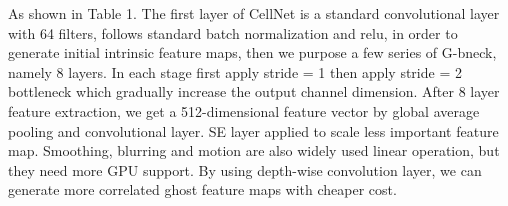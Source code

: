 As shown in Table 1. The first layer of CellNet is a standard convolutional layer with 64 filters, follows standard batch normalization and relu, in order to generate initial intrinsic feature maps, then we purpose a few series of G-bneck, namely 8 layers. In each stage first apply stride = 1 then apply stride = 2 bottleneck which gradually increase the output channel dimension. After 8 layer feature extraction, we get a 512-dimensional feature vector by global average pooling and convolutional layer. SE layer applied to scale less important feature map. Smoothing, blurring and motion are also widely used linear operation, but they need more GPU support. By using depth-wise convolution layer, we can generate more correlated ghost feature maps with cheaper cost.
\begin{table}[htbp]
\centering


\end{table}
